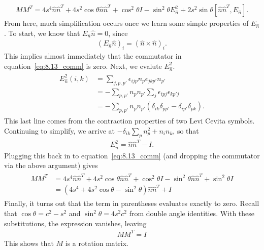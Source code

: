 \documentclass{book}
\begin{document}
    \begin{align} \label{eq:8.13_comm}
        M M^T = 4 s^4 \hat{n} \hat{n}^T + 4 s^2 \cos\theta \hat{n} \hat{n}^T + \cos^2\theta I - \sin^2\theta E_{\hat{n}}^2 + 2 s^2 \sin\theta [\hat{n} \hat{n}^T, E_{\hat{n}}].
    \end{align}
    From here, much simplification occurs once we learn some simple properties of $E_{\hat{n}}$. To start, we know that $E_{\hat{n}} \hat{n} = 0$, since
    \begin{align}
        (E_{\hat{n}} \hat{n})_i = (\hat{n}\times\hat{n})_i.
    \end{align}
    This implies almost immediately that the commutator in equation~\eqref{eq:8.13_comm} is zero. Next, we evalute $E_{\hat{n}}^2$.
    \begin{align}
    \begin{aligned}
        E_{\hat{n}}^2(i,k) &= \sum_{j,p,p'} \epsilon_{ijp} n_p \epsilon_{jkp'} n_{p'} \\
        &= -\sum_{p,p'} n_p n_{p'} \sum_j \epsilon_{ipj}\epsilon_{kp' j} \\
        &= -\sum_{p,p'} n_p n_{p'}(\delta_{ik}\delta_{pp'}-\delta_{ip'}\delta_{pk}).
    \end{aligned}
    \end{align}
    This last line comes from the contraction properties of two Levi Cevita symbols. Continuing to simplify, we arrive at $-\delta_{ik} \sum_p n_p^2 + n_i n_k$, so that
    \begin{align}
        E_{\hat{n}}^2 = \hat{n} \hat{n}^T - I.
    \end{align}
    Plugging this back in to equation~\eqref{eq:8.13_comm} (and dropping the commutator via the above argument) gives
    \begin{align}
    \begin{aligned}
        MM^T &= 4 s^4 \hat{n} \hat{n}^T + 4 s^2 \cos\theta \hat{n}\hat{n}^T + \cos^2\theta I -\sin^2\theta \hat{n}\hat{n}^T + \sin^2\theta I \\
        &= (4 s^4 + 4 s^2 \cos\theta - \sin^2 \theta) \hat{n}\hat{n}^T + I   
    \end{aligned}
    \end{align}
    Finally, it turns out that the term in parentheses evaluates exactly to zero. Recall that $\cos\theta = c^2 - s^2$ and $\sin^2\theta = 4 s^2 c^2$ from double angle identities. With these substitutions, the expression vanishes, leaving
    \begin{align}
        M M^T = I
    \end{align}
    This shows that $M$ is a rotation matrix.
\end{document}
